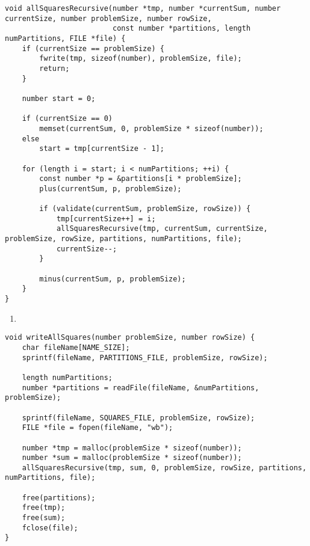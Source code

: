 \begin{lstlisting}[caption={},label={allSquaresRecursive}]
void allSquaresRecursive(number *tmp, number *currentSum, number currentSize, number problemSize, number rowSize,
                         const number *partitions, length numPartitions, FILE *file) {
    if (currentSize == problemSize) {
        fwrite(tmp, sizeof(number), problemSize, file);
        return;
    }

    number start = 0;

    if (currentSize == 0)
        memset(currentSum, 0, problemSize * sizeof(number));
    else
        start = tmp[currentSize - 1];

    for (length i = start; i < numPartitions; ++i) {
        const number *p = &partitions[i * problemSize];
        plus(currentSum, p, problemSize);

        if (validate(currentSum, problemSize, rowSize)) {
            tmp[currentSize++] = i;
            allSquaresRecursive(tmp, currentSum, currentSize, problemSize, rowSize, partitions, numPartitions, file);
            currentSize--;
        }

        minus(currentSum, p, problemSize);
    }
}
\end{lstlisting}

\begin{enumerate}
\addtocounter{enumi}{1}
\item 
\end{enumerate}

\begin{lstlisting}[caption={},label={writeAllSquares}]
void writeAllSquares(number problemSize, number rowSize) {
    char fileName[NAME_SIZE];
    sprintf(fileName, PARTITIONS_FILE, problemSize, rowSize);

    length numPartitions;
    number *partitions = readFile(fileName, &numPartitions, problemSize);

    sprintf(fileName, SQUARES_FILE, problemSize, rowSize);
    FILE *file = fopen(fileName, "wb");

    number *tmp = malloc(problemSize * sizeof(number));
    number *sum = malloc(problemSize * sizeof(number));
    allSquaresRecursive(tmp, sum, 0, problemSize, rowSize, partitions, numPartitions, file);

    free(partitions);
    free(tmp);
    free(sum);
    fclose(file);
}
\end{lstlisting}

